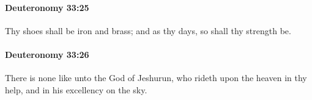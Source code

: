 		\paragraph{Deuteronomy 33:25} %
			\label{DEUTERONOMY-33-25}

			Thy shoes shall be iron and brass; and as thy days, so shall thy strength be.


		\paragraph{Deuteronomy 33:26} %
			\label{DEUTERONOMY-33-26}

			There is none like unto the God of Jeshurun, who rideth upon the heaven in thy help, and in his excellency on the sky.



